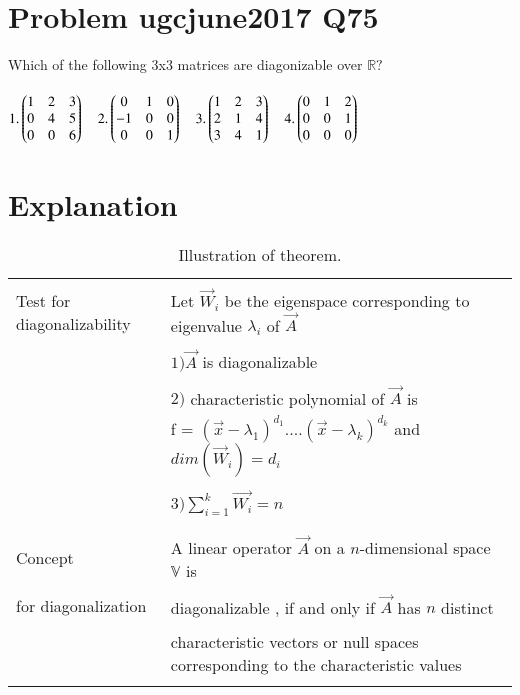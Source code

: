 \documentclass[journal,12pt]{IEEEtran}
\begin{document}
\renewcommand{\thefigure}{\theenumi}
\renewcommand{\thetable}{\theenumi}

\section{\textbf{Problem ugcjune2017 Q75}}
Which of the following 3x3 matrices are diagonizable over $\mathbb{R}?$\\
\\$1.\begin{pmatrix}1&2&3\\0&4&5\\0&0&6\end{pmatrix}\quad 2. \begin{pmatrix}0&1&0\\-1&0&0\\0&0&1\end{pmatrix}\quad 3.\begin{pmatrix}1&2&3\\2&1&4\\3&4&1\end{pmatrix}\quad 4.\begin{pmatrix}0&1&2\\0&0&1\\0&0&0\end{pmatrix}$\\

\section{\textbf{Explanation}}
\renewcommand{\thetable}{1}
\begin{longtable}{|l|l|}
\hline
\multirow{3}{*}{Test for diagonalizability} & \\
& Let $\vec{W}_{i}$ be the eigenspace corresponding to eigenvalue $\lambda_{i}$  of $\vec{A}$\\
&\\
& $1)\vec{A}$ is diagonalizable \\
&\\
& $2)$ characteristic polynomial of $\vec{A}$ is \\
& f = $(\vec{x}-\lambda_1)^{d_1}....(\vec{x}-\lambda_k)^{d_k}$ and $dim(\vec{W}_i) = d_i $\\
&\\
& $3) \sum_{i=1}^{k}\vec{W_i}=n$\\
&\\
\hline
\multirow{3}{*}{Concept} & \\
&
A linear operator $\vec{A}$ on a $n$-dimensional space $\mathbb{V}$ is\\ 
&\\ for diagonalization
& diagonalizable , if and only if $\vec{A}$ has $n$ distinct \\
&\\
& characteristic vectors or null spaces corresponding to the characteristic values\\
\hline
\caption{Illustration of theorem.}
\label{table:1}
\end{longtable}
\newpage
\end{document}
